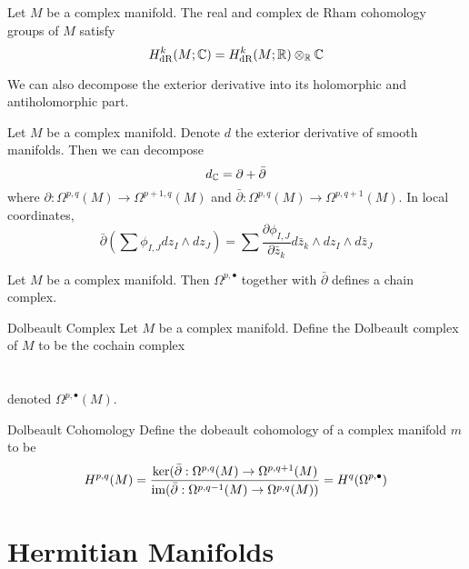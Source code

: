 \documentclass[a4paper]{article}
\begin{document}
\begin{prp}{}{} Let $M$ be a complex manifold. The real and complex de Rham cohomology groups of $M$ satisfy $$H_{\text{dR}}^k(M;\mathbb{C})=H_{\text{dR}}^k(M;\mathbb{R})\otimes_{\mathbb{R}}\mathbb{C}$$
\end{prp}

We can also decompose the exterior derivative into its holomorphic and antiholomorphic part. 

\begin{lmm}{}{} Let $M$ be a complex manifold. Denote $d$ the exterior derivative of smooth manifolds. Then we can decompose $$d_{\mathbb{C}}=\partial+\bar{\partial}$$ where $\partial:\Omega^{p,q}(M)\to\Omega^{p+1,q}(M)$ and $\bar{\partial}:\Omega^{p,q}(M)\to\Omega^{p,q+1}(M)$. In local coordinates, $$\bar{\partial}\left(\sum\phi_{I,J}dz_I\wedge dz_J\right)=\sum\frac{\partial \phi_{I,J}}{\partial \bar{z}_k}d\bar{z}_k\wedge dz_I\wedge d\bar{z}_J$$
\end{lmm}

\begin{prp}{}{} Let $M$ be a complex manifold. Then $\Omega^{p,\bullet}$ together with $\bar{\partial}$ defines a chain complex. 
\end{prp}

\begin{defn}{Dolbeault Complex}{} Let $M$ be a complex manifold. Define the Dolbeault complex of $M$ to be the cochain complex \\~\\
~\\
denoted $\Omega^{p,\bullet}(M)$. 
\end{defn}

\begin{defn}{Dolbeault Cohomology}{} Define the dobeault cohomology of a complex manifold $m$ to be $$H^{p,q}(M)=\frac{\ker(\bar{\partial}:\Omega^{p,q}(M)\to\Omega^{p,q+1}(M)}{\operatorname{im}(\bar{\partial}:\Omega^{p,q-1}(M)\to\Omega^{p,q}(M))}=H^q(\Omega^{p,\bullet})$$
\end{defn}

\pagebreak
\section{Hermitian Manifolds}
\end{document}
